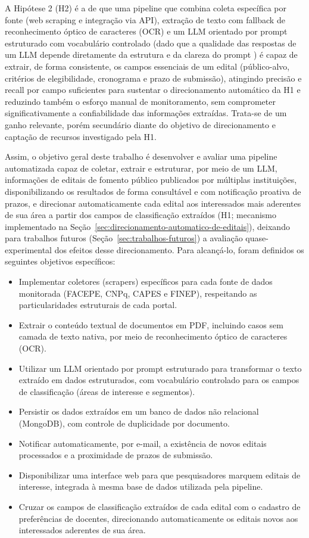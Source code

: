 \documentclass[12pt]{article}
\begin{document}
  A Hipótese 2 (H2) é a de que uma pipeline que combina coleta específica por fonte (web scraping e integração via API), extração de texto com fallback de reconhecimento óptico de caracteres (OCR) e um LLM orientado por prompt estruturado com vocabulário controlado (dado que a qualidade das respostas de um LLM depende diretamente da estrutura e da clareza do prompt \cite{b1,b5}) é capaz de extrair, de forma consistente, os campos essenciais de um edital (público-alvo, critérios de elegibilidade, cronograma e prazo de submissão), atingindo precisão e recall por campo suficientes para sustentar o direcionamento automático da H1 e reduzindo também o esforço manual de monitoramento, sem comprometer significativamente a confiabilidade das informações extraídas. Trata-se de um ganho relevante, porém secundário diante do objetivo de direcionamento e captação de recursos investigado pela H1.

  Assim, o objetivo geral deste trabalho é desenvolver e avaliar uma pipeline automatizada capaz de coletar, extrair e estruturar, por meio de um LLM, informações de editais de fomento público publicados por múltiplas instituições, disponibilizando os resultados de forma consultável e com notificação proativa de prazos, e direcionar automaticamente cada edital aos interessados mais aderentes de sua área a partir dos campos de classificação extraídos (H1; mecanismo implementado na Seção~\ref{sec:direcionamento-automatico-de-editais}), deixando para trabalhos futuros (Seção~\ref{sec:trabalhos-futuros}) a avaliação quase-experimental dos efeitos desse direcionamento. Para alcançá-lo, foram definidos os seguintes objetivos específicos:
  \begin{itemize}
  \item Implementar coletores (scrapers) específicos para cada fonte de dados monitorada (FACEPE, CNPq, CAPES e FINEP), respeitando as particularidades estruturais de cada portal.
  \item Extrair o conteúdo textual de documentos em PDF, incluindo casos sem camada de texto nativa, por meio de reconhecimento óptico de caracteres (OCR).
  \item Utilizar um LLM orientado por prompt estruturado para transformar o texto extraído em dados estruturados, com vocabulário controlado para os campos de classificação (áreas de interesse e segmentos).
  \item Persistir os dados extraídos em um banco de dados não relacional (MongoDB), com controle de duplicidade por documento.
  \item Notificar automaticamente, por e-mail, a existência de novos editais processados e a proximidade de prazos de submissão.
  \item Disponibilizar uma interface web para que pesquisadores marquem editais de interesse, integrada à mesma base de dados utilizada pela pipeline.
  \item Cruzar os campos de classificação extraídos de cada edital com o cadastro de preferências de docentes, direcionando automaticamente os editais novos aos interessados aderentes de sua área.
  \end{itemize}
\end{document}
